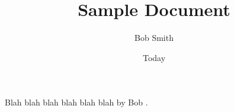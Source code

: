 \documentclass[11pt]{article}
\begin{document}
    \title{Sample Document}
    \author{Bob Smith}
    \date{Today}
    \maketitle

    Blah blah blah blah blah blah by Bob \cite{proce}. 

    {}
    
\end{document}
